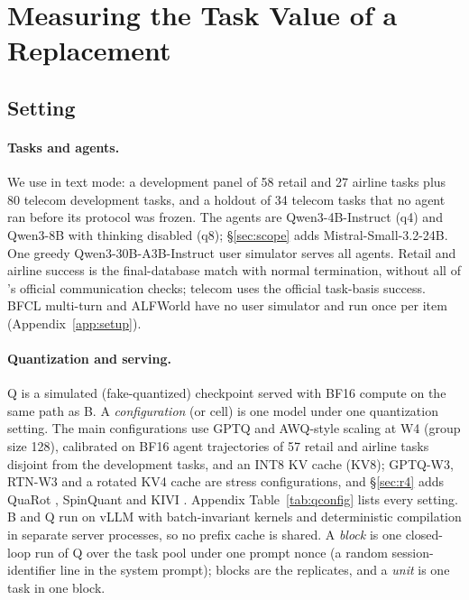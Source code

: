 \section{Measuring the Task Value of a Replacement}
\label{sec:method}

\subsection{Setting}
\label{sec:setting}

\paragraph{Tasks and agents.} We use \tautwo{} in text mode: a development panel of 58 retail and 27 airline tasks plus 80 telecom development tasks, and a holdout of 34 telecom tasks that no agent ran before its protocol was frozen. %
The agents are Qwen3-4B-Instruct (q4) and Qwen3-8B with thinking disabled (q8); \S\ref{sec:scope} adds Mistral-Small-3.2-24B. %
One greedy Qwen3-30B-A3B-Instruct user simulator serves all agents. %
Retail and airline success is the final-database match with normal termination, without all of \tautwo{}'s official communication checks; telecom uses the official task-basis success. BFCL multi-turn and ALFWorld have no user simulator and run once per item (Appendix~\ref{app:setup}).

\paragraph{Quantization and serving.} Q is a simulated (fake-quantized) checkpoint served with BF16 compute on the same path as B. A \emph{configuration} (or cell) is one model under one quantization setting. The main configurations use GPTQ \citep{frantar2023gptq} and AWQ-style scaling \citep{lin2024awq} at W4 (group size 128), calibrated on BF16 agent trajectories of 57 retail and airline tasks disjoint from the development tasks, and an INT8 KV cache (KV8); GPTQ-W3, RTN-W3 and a rotated KV4 cache are stress configurations, and \S\ref{sec:r4} adds QuaRot \citep{ashkboos2024quarot}, SpinQuant \citep{liu2025spinquant} and KIVI \citep{liu2024kivi}. Appendix Table~\ref{tab:qconfig} lists every setting. %
B and Q run on vLLM \citep{kwon2023vllm} with batch-invariant kernels \citep{he2025defeating} and deterministic compilation in separate server processes, so no prefix cache is shared. A \emph{block} is one closed-loop run of Q over the task pool under one prompt nonce (a random session-identifier line in the system prompt); blocks are the replicates, and a \emph{unit} is one task in one block.

